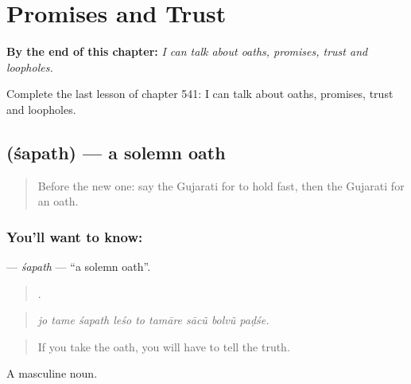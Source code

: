 
\chapter{Promises and Trust}
\label{ch:gu-promises-and-trust}

\begin{chapteropening}
\textbf{By the end of this chapter:} \emph{I can talk about oaths, promises, trust and loopholes.}

Complete the last lesson of chapter 541: I can talk about oaths, promises, trust and loopholes.
\end{chapteropening}

\section[\texorpdfstring{\gu{શપથ} (śapath)}{શપથ (śapath)}]{ (śapath) — a solemn oath}

\label{lesson:GU-C541-sapath}



\begin{quote}
Before the new one: say the Gujarati for to hold fast, then the Gujarati for an oath.
\end{quote}

\subsection*{You'll want to know: }
\textbf{} — \emph{śapath} — \textquotedblleft{}a solemn oath\textquotedblright{}.

\begin{quote}
        .
\end{quote}

\begin{quote}
\emph{jo tame śapath leśo to tamāre sācũ bolvũ paḍśe.}
\end{quote}

\begin{quote}
If you take the oath, you will have to tell the truth.
\end{quote}

A masculine noun.

